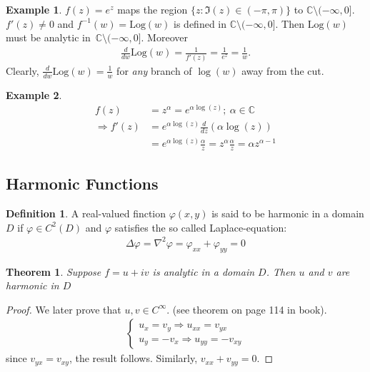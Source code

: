 \documentclass[12pt, a4paper]{article}
\theoremstyle{plain}
\newtheorem{thm}{Theorem} %
\theoremstyle{definition}
\newtheorem{definition}{Definition} %
\newtheorem{example}{Example} %
\begin{document}
			\begin{example}
				$f(z)=e^z$ maps the region $\{z:\Im(z)\in(-\pi,\pi)\}$ to $\mathbb{C}\setminus(-\infty,0]$. $f'(z)\not=0$ and $f^{-1}(w) = \mathrm{Log}(w)$ is defined in $\mathbb{C}\setminus(-\infty,0]$. Then $\mathrm{Log}(w)$ must be analytic in $\mathbb{C}\setminus(-\infty,0]$. Moreover
				\begin{align*}
					\frac{d}{dw}\mathrm{Log}(w) = \frac{1}{f'(z)} = \frac{1}{e^z} = \frac{1}{w}.
				\end{align*}
				Clearly, $\frac{d}{dw}\mathrm{Log}(w) = \frac{1}{w}$ for \textit{any} branch of $\log(w)$ away from the cut.
			\end{example}
			\begin{example}
				\begin{align*}
					f(z) &= z^\alpha	= e^{\alpha\log(z)};\:\alpha\in \mathbb{C}\\
					\Rightarrow f'(z) 	&= e^{\alpha\log(z)} \frac{d}{dz}(\alpha\log(z)) \\
										&= e^{\alpha\log(z)}\frac{\alpha}{z} = z^\alpha \frac{\alpha}{z} = \alpha z^{\alpha-1}
				\end{align*}
			\end{example}
		\subsection{Harmonic Functions} %
		\label{sub:harmonic_functions}
			\begin{definition}
				A real-valued finction $\varphi(x,y)$ is said to be harmonic in a domain $D$ if $\varphi\in C^2(D)$ and $\varphi$ satisfies the so called Laplace-equation:
				\begin{align*}
					\Delta \varphi = \nabla^2 \varphi = \varphi_{xx} + \varphi_{yy} = 0\tag*{in $D$}
				\end{align*}
			\end{definition}

			\begin{thm}
				Suppose $f=u+iv$ is analytic in a domain $D$. Then $u$ and $v$ are harmonic in $D$
			\end{thm}

			\begin{proof}
				We later prove that $u,v\in C^\infty$. (see theorem on page 114 in book).
				\begin{align*}
					\begin{cases}
						u_x = v_y \Rightarrow u_{xx} =v_{yx}\\
						u_y = -v_x \Rightarrow u_{yy} = -v_{xy}
					\end{cases}
				\end{align*}
				since $v_{yx} = v_{xy}$, the result follows. Similarly, $v_{xx} + v_{yy} = 0$.
			\end{proof}
\end{document}
